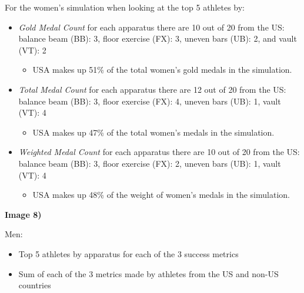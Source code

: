 \documentclass[
  letterpaper,
  DIV=11,
  numbers=noendperiod]{scrartcl}
\providecommand{\tightlist}{%
  \setlength{\itemsep}{0pt}\setlength{\parskip}{0pt}}\usepackage{longtable,booktabs,array}
\begin{document}
For the women's simulation when looking at the top 5 athletes by:

\begin{itemize}
\item
  \emph{Gold Medal Count} for each apparatus there are 10 out of 20 from
  the US: balance beam (BB): 3, floor exercise (FX): 3, uneven bars
  (UB): 2, and vault (VT): 2

  \begin{itemize}
  \tightlist
  \item
    USA makes up 51\% of the total women's gold medals in the
    simulation.
  \end{itemize}
\item
  \emph{Total Medal Count} for each apparatus there are 12 out of 20
  from the US: balance beam (BB): 3, floor exercise (FX): 4, uneven bars
  (UB): 1, vault (VT): 4

  \begin{itemize}
  \tightlist
  \item
    USA makes up 47\% of the total women's medals in the simulation.
  \end{itemize}
\item
  \emph{Weighted Medal Count} for each apparatus there are 10 out of 20
  from the US: balance beam (BB): 3, floor exercise (FX): 2, uneven bars
  (UB): 1, vault (VT): 4

  \begin{itemize}
  \tightlist
  \item
    USA makes up 48\% of the weight of women's medals in the simulation.
  \end{itemize}
\end{itemize}

\textbf{Image 8)}

Men:

\begin{itemize}
\item
  Top 5 athletes by apparatus for each of the 3 success metrics
\item
  Sum of each of the 3 metrics made by athletes from the US and non-US
  countries
\end{itemize}
\end{document}
